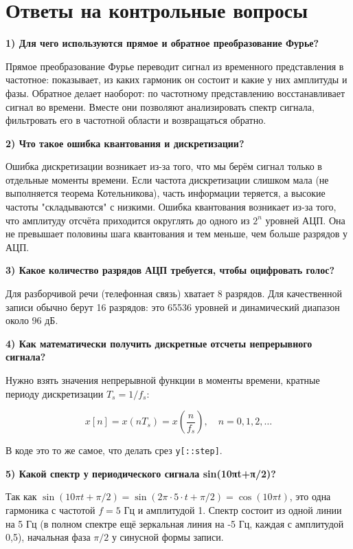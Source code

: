 \documentclass[a4paper,14pt,oneside,openany]{memoir}
\begin{document}
\section{Ответы на контрольные вопросы}

\textbf{1) Для чего используются прямое и обратное преобразование Фурье?}

Прямое преобразование Фурье переводит сигнал из временного представления в частотное: показывает, из каких гармоник он состоит и какие у них амплитуды и фазы. Обратное делает наоборот: по частотному представлению восстанавливает сигнал во времени. Вместе они позволяют анализировать спектр сигнала, фильтровать его в частотной области и возвращаться обратно.

\textbf{2) Что такое ошибка квантования и дискретизации?}

Ошибка дискретизации возникает из-за того, что мы берём сигнал только в отдельные моменты времени. Если частота дискретизации слишком мала (не выполняется теорема Котельникова), часть информации теряется, а высокие частоты "складываются" с низкими. Ошибка квантования возникает из-за того, что амплитуду отсчёта приходится округлять до одного из $2^n$ уровней АЦП. Она не превышает половины шага квантования и тем меньше, чем больше разрядов у АЦП.

\textbf{3) Какое количество разрядов АЦП требуется, чтобы оцифровать голос?}

Для разборчивой речи (телефонная связь) хватает 8 разрядов. Для качественной записи обычно берут 16 разрядов: это 65536 уровней и динамический диапазон около 96 дБ.

\textbf{4) Как математически получить дискретные отсчеты непрерывного сигнала?}

Нужно взять значения непрерывной функции в моменты времени, кратные периоду дискретизации $T_s = 1/f_s$:

\begin{equation*}
x[n] = x(nT_s) = x\left(\frac{n}{f_s}\right),\quad n = 0, 1, 2, \dots
\end{equation*}

В коде это то же самое, что делать срез \texttt{y[::step]}.

\textbf{5) Какой спектр у периодического сигнала sin(10πt+π/2)?}

Так как $\sin(10\pi t + \pi/2) = \sin(2\pi \cdot 5 \cdot t + \pi/2) = \cos(10\pi t)$, это одна гармоника с частотой $f = 5$ Гц и амплитудой 1. Спектр состоит из одной линии на 5 Гц (в полном спектре ещё зеркальная линия на -5 Гц, каждая с амплитудой 0,5), начальная фаза $\pi/2$ у синусной формы записи.
\end{document}

